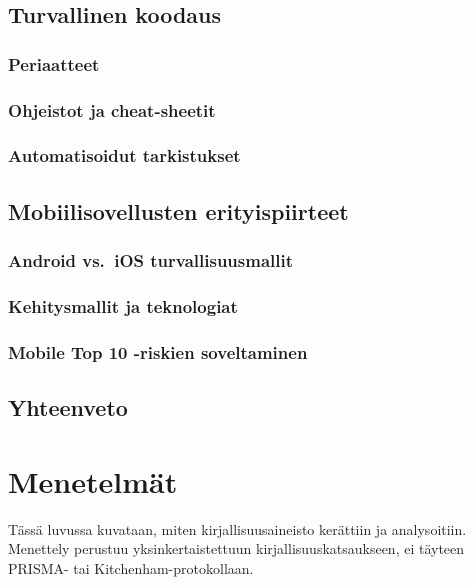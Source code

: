 \documentclass[bscthesis,finnish,oneside,biblatex]{uefcsthesis}
\begin{document}
\section{Turvallinen koodaus}
\label{sec:secure-code}
  \subsection{Periaatteet}
  \subsection{Ohjeistot ja cheat-sheetit}
  \subsection{Automatisoidut tarkistukset}

\section{Mobiilisovellusten erityispiirteet}
\label{sec:mobile}
  \subsection{Android vs.\ iOS turvallisuusmallit}
  \subsection{Kehitysmallit ja teknologiat}
  \subsection{Mobile Top 10 -riskien soveltaminen}

\section{Yhteenveto}
\label{sec:teoria-yhteenveto}

\chapter{Menetelmät}
\label{cha:methods}

Tässä luvussa kuvataan, miten kirjallisuusaineisto kerättiin ja analysoitiin.
Menettely perustuu yksinkertaistettuun kirjallisuuskatsaukseen, ei täyteen
PRISMA- tai Kitchenham-protokollaan.
\end{document}

